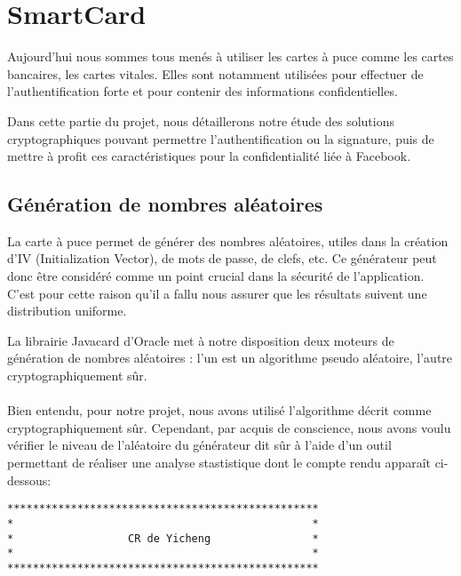 \documentclass[a4paper,11pt,french]{article}
\begin{document}
\section{SmartCard}
Aujourd'hui nous sommes tous menés à utiliser les cartes à puce comme les cartes
bancaires, les cartes vitales. Elles sont notamment utilisées pour effectuer de 
l'authentification forte et pour contenir des informations confidentielles.

Dans cette partie du projet, nous détaillerons notre étude des solutions 
cryptographiques pouvant permettre l'authentification ou la signature, puis de 
mettre à profit ces caractéristiques pour la confidentialité liée à Facebook.


\subsection{Génération de nombres aléatoires}
La carte à puce permet de générer des nombres aléatoires, utiles dans la création
d'IV (Initialization Vector), de mots de passe, de clefs, etc. Ce générateur 
peut donc être considéré comme un point crucial dans la sécurité de l'application.
C'est pour cette raison qu'il a fallu nous assurer que les résultats suivent une
distribution uniforme. 

La librairie Javacard d'Oracle met à notre disposition deux moteurs de génération
de nombres aléatoires : l'un est un algorithme pseudo aléatoire, l'autre 
cryptographiquement sûr.

\paragraph{}
Bien entendu, pour notre projet, nous avons utilisé l'algorithme décrit comme 
\og{}cryptographiquement sûr\fg{}. Cependant, par acquis de conscience, nous avons voulu
vérifier le niveau de l'aléatoire du générateur dit sûr à l'aide d'un
outil permettant de réaliser une analyse stastistique dont le compte rendu
apparaît ci-dessous:

\begin{verbatim}
*************************************************
*                                               *
*                  CR de Yicheng                *
*                                               *
*************************************************
\end{verbatim}

\end{document}
